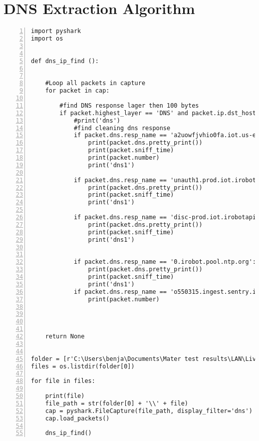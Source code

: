 \chapter{DNS Extraction Algorithm}
\label{app:DNSex}


\begin{lstlisting}[numbers=left]
import pyshark
import os


def dns_ip_find ():
    
    
    #Loop all packets in capture
    for packet in cap:

        #find DNS response lager then 100 bytes 
        if packet.highest_layer == 'DNS' and packet.ip.dst_host == '192.168.0.56':
            #print('dns')
            #find cleaning dns response
            if packet.dns.resp_name == 'a2uowfjvhio0fa.iot.us-east-1.amazonaws.com':
                print(packet.dns.pretty_print())
                print(packet.sniff_time)
                print(packet.number)
                print('dns1')

            if packet.dns.resp_name == 'unauth1.prod.iot.irobotapi.com':
                print(packet.dns.pretty_print())
                print(packet.sniff_time)
                print('dns1')

            if packet.dns.resp_name == 'disc-prod.iot.irobotapi.com':
                print(packet.dns.pretty_print())
                print(packet.sniff_time)
                print('dns1')


            if packet.dns.resp_name == '0.irobot.pool.ntp.org':
                print(packet.dns.pretty_print())
                print(packet.sniff_time)
                print('dns1')
            if packet.dns.resp_name == 'o550315.ingest.sentry.io':
                print(packet.number)
            
    
 

    return None


folder = [r'C:\Users\benja\Documents\Mater test results\LAN\Live\Env1_dns']
files = os.listdir(folder[0])

for file in files:

    print(file)
    file_path = str(folder[0] + '\\' + file)
    cap = pyshark.FileCapture(file_path, display_filter='dns')
    cap.load_packets()

    dns_ip_find()
\end{lstlisting}